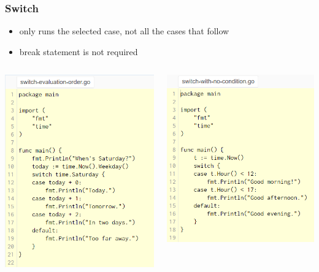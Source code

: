 \documentclass[14pt]{beamer}
\begin{document}
{
\begin{frame}
    \frametitle{Switch}
    \begin{itemize}
        \item only runs the selected case, not all the cases that follow
        \item break statement is not required
    \end{itemize}
    \begin{columns}
        \begin{column}{0.5\textwidth}
        \includegraphics[width=0.75\linewidth]{img/switch1.PNG}
        \end{column}
        \begin{column}{0.5\textwidth}
        \includegraphics[width=0.8\linewidth]{img/switch2.PNG}
        \end{column}
    \end{columns}
\end{frame}
}
\end{document}
